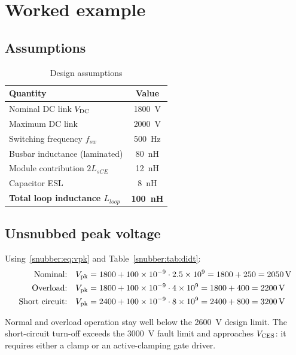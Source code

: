 \section{Worked example}

\subsection{Assumptions}

\begin{table}[htbp]
\centering
\caption{Design assumptions}
\label{snubber:tab:assump}
\begin{tabular}{lc}
\toprule
Quantity & Value \\
\midrule
Nominal DC link $V_{\mathrm{DC}}$              & \SI{1800}{\volt} \\
Maximum DC link                      & \SI{2000}{\volt} \\
Switching frequency $f_{sw}$        & \SI{500}{\hertz} \\
Busbar inductance (laminated)        & \SI{80}{\nano\henry} \\
Module contribution $2L_{sCE}$      & \SI{12}{\nano\henry} \\
Capacitor ESL                        & \SI{8}{\nano\henry} \\
\textbf{Total loop inductance $L_{loop}$} & \textbf{\SI{100}{\nano\henry}} \\
\bottomrule
\end{tabular}
\end{table}

\subsection{Unsnubbed peak voltage}

Using~\eqref{snubber:eq:vpk} and Table~\ref{snubber:tab:didt}:
\begin{align}
\text{Nominal:}\quad
V_{\mathrm{pk}} &= 1800 + 100\times10^{-9}\cdot 2.5\times10^{9}
      = 1800 + 250 = \SI{2050}{\volt} \\
\text{Overload:}\quad
V_{\mathrm{pk}} &= 1800 + 100\times10^{-9}\cdot 4\times10^{9}
      = 1800 + 400 = \SI{2200}{\volt} \\
\text{Short circuit:}\quad
V_{\mathrm{pk}} &= 2400 + 100\times10^{-9}\cdot 8\times10^{9}
      = 2400 + 800 = \SI{3200}{\volt}
\end{align}

Normal and overload operation stay well below the \SI{2600}{\volt} design
limit. The short-circuit turn-off exceeds the \SI{3000}{\volt} fault limit and
approaches $V_{\mathrm{CES}}$: it requires either a clamp or an active-clamping gate
driver.

